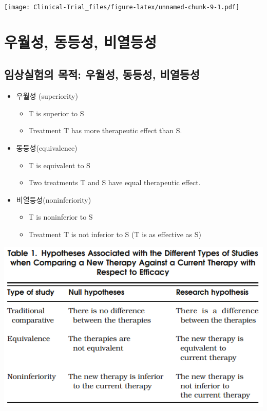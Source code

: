 \documentclass[
]{book}
\providecommand{\tightlist}{%
  \setlength{\itemsep}{0pt}\setlength{\parskip}{0pt}}
\begin{document}
\texttt{[image: Clinical-Trial\_files/figure-latex/unnamed-chunk-9-1.pdf]}

\hypertarget{designtype}{%
\chapter{우월성, 동등성, 비열등성}\label{designtype}}

\hypertarget{uxc784uxc0c1uxc2e4uxd5d8uxc758-uxbaa9uxc801-uxc6b0uxc6d4uxc131-uxb3d9uxb4f1uxc131-uxbe44uxc5f4uxb4f1uxc131}{%
\section{임상실험의 목적: 우월성, 동등성, 비열등성}\label{uxc784uxc0c1uxc2e4uxd5d8uxc758-uxbaa9uxc801-uxc6b0uxc6d4uxc131-uxb3d9uxb4f1uxc131-uxbe44uxc5f4uxb4f1uxc131}}

\begin{itemize}
\tightlist
\item
  우월성 (superiority)

  \begin{itemize}
  \tightlist
  \item
    T is superior to S
  \item
    Treatment T has more therapeutic effect than S.
  \end{itemize}
\item
  동등성(equivalence)

  \begin{itemize}
  \tightlist
  \item
    T is equivalent to S
  \item
    Two treatments T and S have equal therapeutic effect.
  \end{itemize}
\item
  비열등성(noninferiority)

  \begin{itemize}
  \tightlist
  \item
    T is noninferior to S
  \item
    Treatment T is not inferior to S (T is as effective as S)
  \end{itemize}
\end{itemize}

\includegraphics{equiv-meaning.png}
\end{document}
